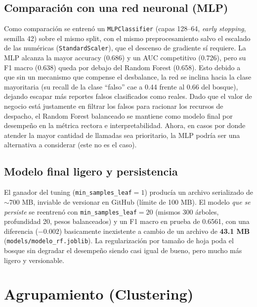 \documentclass[11pt,letterpaper]{article}
\begin{document}
\subsection{Comparación con una red neuronal (MLP)}
\label{sec:mlp}

Como comparación se entrenó un \texttt{MLPClassifier} (capas 128--64,
\emph{early stopping}, semilla 42) sobre el mismo split, con el mismo
preprocesamiento salvo el escalado de las numéricas
(\texttt{StandardScaler}), que el descenso de gradiente sí requiere. La MLP
alcanza la mayor accuracy (0.686) y un AUC competitivo (0.726), pero su F1
macro (0.638) queda por debajo del Random Forest (0.658). Esto debido a que sin un mecanismo que
compense el desbalance, la red se inclina hacia la clase mayoritaria (su
recall de la clase ``falso'' cae a 0.44 frente al 0.66 del bosque), dejando
escapar más reportes falsos clasificados como reales. Dado que el valor de
negocio está justamente en filtrar los falsos para racionar los recursos de
despacho, el Random Forest balanceado se mantiene como modelo final por
desempeño en la métrica rectora e interpretabilidad. Ahora, en casos por donde
atender la mayor cantidad de llamadas sea prioritario, la MLP podría ser una 
alternativa a considerar (este no es el caso).

\subsection{Modelo final ligero y persistencia}

El ganador del tuning (\texttt{min\_samples\_leaf}$=1$) producía un archivo
serializado de $\sim$700 MB, inviable de versionar en GitHub (límite de 100
MB). El modelo \emph{que se persiste} se reentrenó con
\texttt{min\_samples\_leaf}$=20$ (mismos 300 árboles, profundidad 20, pesos
balanceados) y un F1 macro en prueba de 0.6561, con una diferencia ($-0.002$)
basicamente inexistente a cambio de un archivo de \textbf{43.1 MB}
(\texttt{models/modelo\_rf.joblib}). La regularización por
tamaño de hoja poda el bosque sin degradar el desempeño siendo casi igual de bueno, 
pero mucho más ligero y versionable.

\section{Agrupamiento (Clustering)}
\end{document}

